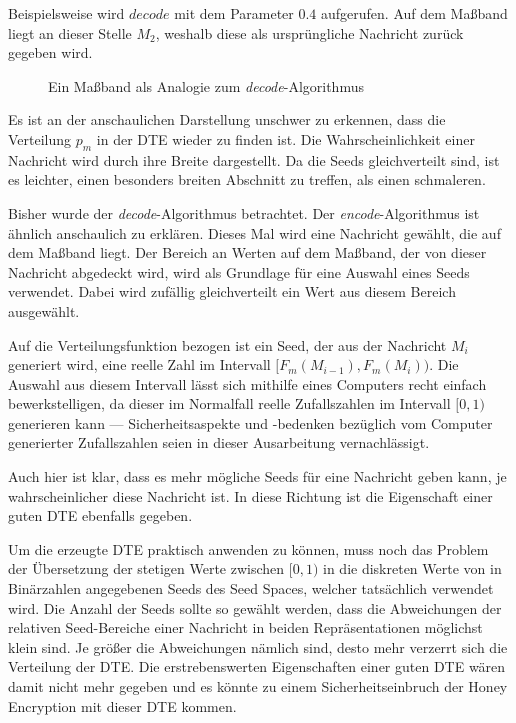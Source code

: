 Beispielsweise wird $decode$ mit dem Parameter $0.4$ aufgerufen. Auf dem Maßband liegt an dieser Stelle $M_2$, weshalb diese als ursprüngliche Nachricht zurück gegeben wird.

\begin{figure}[!h]
\center
{}
\caption{Ein Maßband als Analogie zum \emph{decode}-Algorithmus}
\label{fig:decode}
\end{figure}

Es ist an der anschaulichen Darstellung unschwer zu erkennen, dass die Verteilung $p_m$ in der DTE wieder zu finden ist. Die Wahrscheinlichkeit einer Nachricht wird durch ihre Breite dargestellt. Da die Seeds gleichverteilt sind, ist es leichter, einen besonders breiten Abschnitt zu treffen, als einen schmaleren.

Bisher wurde der \emph{decode}-Algorithmus betrachtet. Der \emph{encode}-Algorithmus ist ähnlich anschaulich zu erklären. Dieses Mal wird eine Nachricht gewählt, die auf dem Maßband liegt. Der Bereich an Werten auf dem Maßband, der von dieser Nachricht abgedeckt wird, wird als Grundlage für eine Auswahl eines Seeds verwendet. Dabei wird zufällig gleichverteilt ein Wert aus diesem Bereich ausgewählt.

Auf die Verteilungsfunktion bezogen ist ein Seed, der aus der Nachricht $M_i$ generiert wird, eine reelle Zahl im Intervall $[F_m(M_{i-1}), F_m(M_i))$. Die Auswahl aus diesem Intervall lässt sich mithilfe eines Computers recht einfach bewerkstelligen, da dieser im Normalfall reelle Zufallszahlen im Intervall $[0,1)$ generieren kann --- Sicherheitsaspekte und -bedenken bezüglich vom Computer generierter Zufallszahlen seien in dieser Ausarbeitung vernachlässigt.

Auch hier ist klar, dass es mehr mögliche Seeds für eine Nachricht geben kann, je wahrscheinlicher diese Nachricht ist. In diese Richtung ist die Eigenschaft einer guten DTE ebenfalls gegeben.

Um die erzeugte DTE praktisch anwenden zu können, muss noch das Problem der Übersetzung der stetigen Werte zwischen $[0,1)$ in die diskreten Werte von in Binärzahlen angegebenen Seeds des Seed Spaces, welcher tatsächlich verwendet wird. Die Anzahl der Seeds sollte so gewählt werden, dass die Abweichungen der relativen Seed-Bereiche einer Nachricht in beiden Repräsentationen möglichst klein sind. Je größer die Abweichungen nämlich sind, desto mehr verzerrt sich die Verteilung der DTE. Die erstrebenswerten Eigenschaften einer guten DTE wären damit nicht mehr gegeben und es könnte zu einem Sicherheitseinbruch der Honey Encryption mit dieser DTE kommen.

\newpage